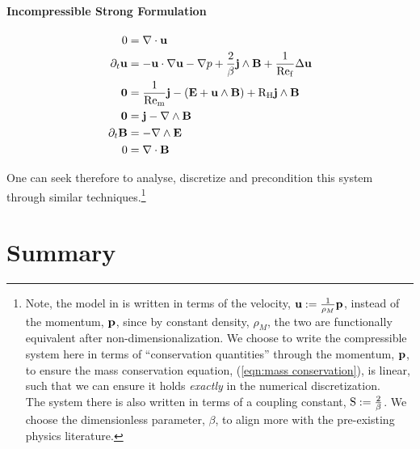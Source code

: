     \line

    \paragraph*{Incompressible Strong Formulation}
    
    \begin{align}
        0  &=  \nabla\cdot\mathbf{u}  \label{eqn:incompressible mass conservation}  \\
        \partial_{t}\mathbf{u}  &=  - \mathbf{u}\cdot\nabla\mathbf{u} - \nabla p + \frac{2}{\beta}\mathbf{j}\wedge\mathbf{B} + \frac{1}{\mathrm{Re}_{\mathrm{f}}}\Delta\mathbf{u}  \label{eqn:incompressible momentum conservation}  \\
        \mathbf{0}  &=  \frac{1}{\mathrm{Re}_{\mathrm{m}}}\mathbf{j} - \left(\mathbf{E} + \mathbf{u}\wedge\mathbf{B}\right) + \mathrm{R}_{\mathrm{H}}\mathbf{j}\wedge\mathbf{B}  \label{eqn:incompressible current identity}  \\
        \mathbf{0}  &=  \mathbf{j} - \nabla\wedge\mathbf{B}  \label{eqn:incompressible Ampère's law}  \\
        \partial_{t}\mathbf{B}  &=  - \nabla\wedge\mathbf{E}  \label{eqn:incompressible Faraday's law}  \\
        0  &=  \nabla\cdot\mathbf{B}  \label{eqn:incompressible Gauss's law}
    \end{align}

    \line

    One can seek therefore to analyse, discretize and precondition this system through similar techniques.\footnote{Note, the model in \cite{LHF22} is written in terms of the velocity, $\mathbf{u}  :=  \frac{1}{\rho_{M}}\mathbf{p}$, instead of the momentum, $\mathbf{p}$, since by constant density, $\rho_{M}$, the two are functionally equivalent after non-dimensionalization. We choose to write the compressible system here in terms of ``conservation quantities'' through the momentum, $\mathbf{p}$, to ensure the mass conservation equation, (\ref{eqn:mass conservation}), is linear, such that we can ensure it holds \emph{exactly} in the numerical discretization. \\ The system there is also written in terms of a coupling constant, $\mathrm{S}  :=  \frac{2}{\beta}$. We choose the dimensionless parameter, $\beta$, to align more with the pre-existing physics literature. \BA{([Ref])}}
    

    
    
    
    
    

    
    \section*{Summary}
    